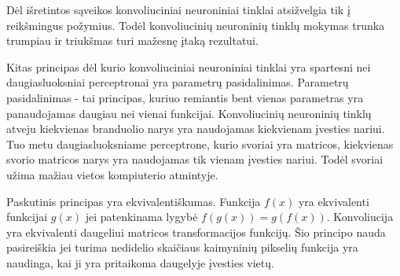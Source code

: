 Dėl išretintos sąveikos konvoliuciniai neuroniniai tinklai atsižvelgia tik į reikšmingus požymius. Todėl konvoliucinių neuroninių tinklų mokymas trunka trumpiau ir triukšmas turi mažesnę įtaką rezultatui.

Kitas principas dėl kurio konvoliuciniai neuroniniai tinklai yra spartesni nei daugiasluoksniai perceptronai yra parametrų pasidalinimas. Parametrų pasidalinimas - tai principas, kuriuo remiantis bent vienas parametras yra panaudojamas daugiau nei vienai funkcijai. Konvoliucinių neuroninių tinklų atveju kiekvienas branduolio narys yra naudojamas kiekvienam įvesties nariui. Tuo metu daugiasluoksniame perceptrone, kurio svoriai yra matricos, kiekvienas svorio matricos narys yra naudojamas tik vienam įvesties nariui. Todėl svoriai užima mažiau vietos kompiuterio atmintyje.

Paskutinis principas yra ekvivalentiškumas. Funkcija $f(x)$ yra ekvivalenti funkcijai $g(x)$ jei patenkinama lygybė $f(g(x)) = g(f(x))$. Konvoliucija yra ekvivalenti daugeliui matricos transformacijos funkcijų. Šio principo nauda pasireiškia jei turima nedidelio skaičiaus kaimyninių pikselių funkcija yra naudinga, kai ji yra pritaikoma daugelyje įvesties vietų.
